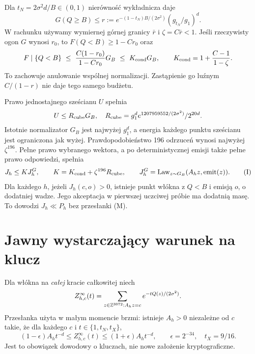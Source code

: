 \documentclass[11pt,a4paper]{article}
\begin{document}
Dla $t_N=2\sigma^2d/B\in(0,1)$ nierówność wykładnicza daje
\[
 G(Q\ge B)\le r:=e^{-(1-t_N)B/(2\sigma^2)}(g_{t_N}/g_1)^d.
\]
W rachunku używamy wymiernej górnej granicy $\bar r$ i $\zeta=C\bar r<1$.
Jeśli rzeczywisty ogon $G$ wynosi $r_0$, to
$F(Q<B)\ge1-Cr_0$ oraz
\[
 F\mid\{Q<B\}\ \le\ \frac{C(1-r_0)}{1-Cr_0}G_B
 \ \le\ K_{\rm cond}G_B,\qquad
 K_{\rm cond}=1+\frac{C-1}{1-\zeta}.
\]
To zachowuje anulowanie wspólnej normalizacji. Zastąpienie go luźnym
$C/(1-r)$ nie daje tego samego budżetu.

Prawo jednostajnego sześcianu $U$ spełnia
\[
 U\le R_{\rm cube}G_B,\quad
 R_{\rm cube}=g_1^d e^{1207959552/(2\sigma^2)}/2^{20d}.
\]
Istotnie normalizator $G_B$ jest najwyżej $g_1^d$, a energia każdego
punktu sześcianu jest ograniczona jak wyżej. Prawdopodobieństwo 196
odrzuceń wynosi najwyżej $\zeta^{196}$. Pełne prawo wybranego wektora,
a po deterministycznej emisji także pełne prawo odpowiedzi, spełnia
\[
 J_h\le K J^G_h,\qquad
 K=K_{\rm cond}+\zeta^{196}R_{\rm cube},\qquad
 J^G_h=\operatorname{Law}_{z\sim G_B}(A_hz,\operatorname{emit}(z)). \tag{I}
\]
Dla każdego $h$, jeżeli $J_h(c,o)>0$, istnieje punkt włókna z $Q<B$
i emisją $o$, o dodatniej wadze. Jego akceptacja w pierwszej uczciwej
próbie ma dodatnią masę. To dowodzi $J_h\ll P_h$ bez przesłanki (M).

\section{Jawny wystarczający warunek na klucz}
Dla włókna na \emph{całej} kracie całkowitej niech
\[
 Z^\infty_{h,c}(t)=\sum_{z\in\mathbb Z^{3072}:A_hz=c}e^{-tQ(z)/(2\sigma^2)}.
\]
Przesłanka użyta w małym momencie brzmi: istnieje $A_h>0$ niezależne od $c$
takie, że dla każdego $c$ i $t\in\{1,t_N,t_X\}$,
\[
 (1-\epsilon)A_h t^{-d}\le Z^\infty_{h,c}(t)
 \le(1+\epsilon)A_h t^{-d},\qquad
 \epsilon=2^{-34},\quad t_X=9/16.                 \tag{M}
\]
Jest to obowiązek dowodowy o kluczach, nie nowe założenie kryptograficzne.
\end{document}
